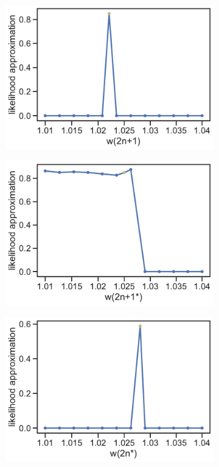 \documentclass[12pt]{extarticle}
\begin{document}
\begin{figure}[p]
\begin{subfigure}{0.3\textwidth}
      \includegraphics[width=\textwidth]{../figures/sensitivity-w(2n+1)-plot.pdf}      
      \label{fig:sensitivity-anwt}
  \end{subfigure}
    \begin{subfigure}{0.3\textwidth}
      \includegraphics[width=\textwidth]{../figures/sensitivity-w(2n+1*)-plot.pdf}      
      \label{fig:sensitivity-anmt}
  \end{subfigure}
    \begin{subfigure}{0.3\textwidth}
      \includegraphics[width=\textwidth]{../figures/sensitivity-w(2n*)-plot.pdf}      

\end{subfigure}
\end{figure}
\end{document}
